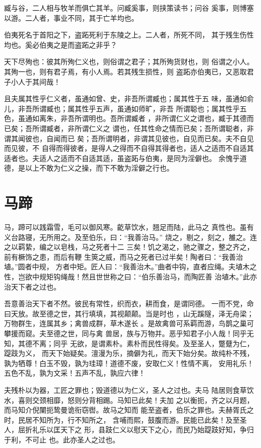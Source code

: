 \documentclass[12pt,UTF8]{ctexbook}
\begin{document}
臧与谷，二人相与牧羊而俱亡其羊。问臧奚事，则挟策读书；问谷 奚事，则博塞以游。二人者，事业不同，其于亡羊均也。

伯夷死名于首阳之下，盗跖死利于东陵之上。二人者，所死不同， 其于残生伤性均也。奚必伯夷之是而盗跖之非乎？

天下尽殉也：彼其所殉仁义也，则俗谓之君子；其所殉货财也，则 俗谓之小人。其殉一也，则有君子焉，有小人焉。若其残生损性，则 盗跖亦伯夷已，又恶取君子小人于其间哉！

且夫属其性乎仁义者，虽通如曾、史，非吾所谓臧也；属其性于五 味，虽通如俞儿，非吾所谓臧也；属其性乎五声，虽通如师旷，非吾 所谓聪也；属其性乎五色，虽通如离朱，非吾所谓明也。吾所谓臧者 ，非所谓仁义之谓也，臧于其德而已矣；吾所谓臧者，非所谓仁义之 谓也，任其性命之情而已矣；吾所谓聪者，非谓其闻彼也，自闻而已 矣；吾所谓明者，非谓其见彼也，自见而已矣。夫不自见而见彼，不 自得而得彼者，是得人之得而不自得其得者也，适人之适而不自适其 适者也。夫适人之适而不自适其适，虽盗跖与伯夷，是同为淫僻也。 余愧乎道德，是以上不敢为仁义之操，而下不敢为淫僻之行也。


\section{马蹄}

马，蹄可以践霜雪，毛可以御风寒。齕草饮水，翘足而陆，此马之 真性也。虽有义台路寝，无所用之。及至伯乐，曰：“我善治马。” 烧之，剔之，刻之，雒之。连之以羁絷，编之以皂栈，马之死者十二 三矣！饥之渴之，驰之骤之，整之齐之，前有橛饰之患，而后有鞭 生筴之威，而马之死者已过半矣！陶者曰：“我善治埴。”圆者中规， 方者中矩。匠人曰：“我善治木。”曲者中钩，直者应绳。夫埴木之 性，岂欲中规矩钩绳哉！然且世世称之曰：“伯乐善治马，而陶匠善 治埴木。”此亦治天下者之过也。

吾意善治天下者不然。彼民有常性，织而衣，耕而食，是谓同德。 一而不党，命曰天放。故至德之世，其行填填，其视颠颠。当是时也 ，山无蹊隧，泽无舟梁；万物群生，连属其乡；禽兽成群，草木遂长 。是故禽兽可系羁而游，鸟鹊之巢可攀援而窥。夫至德之世，同与禽 兽居，族与万物并。恶乎知君子小人哉！同乎无知，其德不离；同乎 无欲，是谓素朴。素朴而民性得矣。及至圣人，蹩躠为仁，踶跂为义， 而天下始疑矣。澶漫为乐，摘僻为礼，而天下始分矣。故纯朴不残， 孰为牺尊！白玉不毁，孰为珪璋！道德不废，安取仁义！性情不离， 安用礼乐！五色不乱，孰为文采！五声不乱，孰应六律！

夫残朴以为器，工匠之罪也；毁道德以为仁义，圣人之过也。夫马 陆居则食草饮水，喜则交颈相靡，怒则分背相踢。马知已此矣！夫加 之以衡扼，齐之以月题，而马知介倪闉扼鸷曼诡衔窃辔。故马之知而 能至盗者，伯乐之罪也。夫赫胥氏之时，民居不知所为，行不知所之， 含哺而熙，鼓腹而游。民能已此矣！及至圣人，屈折礼乐以匡天下之 形，县跂仁义以慰天下之心，而民乃始踶跂好知，争归于利，不可止 也。此亦圣人之过也。
\end{document}
